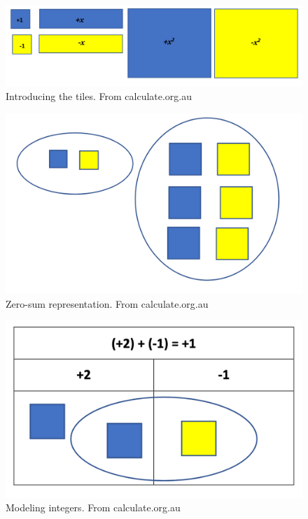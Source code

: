 \documentclass[
  letterpaper,
  DIV=11,
  numbers=noendperiod]{scrartcl}
\begin{document}
\begin{figure}[H]

{\centering \includegraphics{../img/mod03/algebra-tile-0.png}

}

\caption{Introducing the tiles. From calculate.org.au}

\end{figure}%
\begin{figure}[H]

{\centering \includegraphics{../img/mod03/algebra-tile-1.png}

}

\caption{Zero-sum representation. From calculate.org.au}

\end{figure}%
\begin{figure}[H]

{\centering \includegraphics{../img/mod03/algebra-tile-2.png}

}

\caption{Modeling integers. From calculate.org.au}

\end{figure}%
\end{document}

